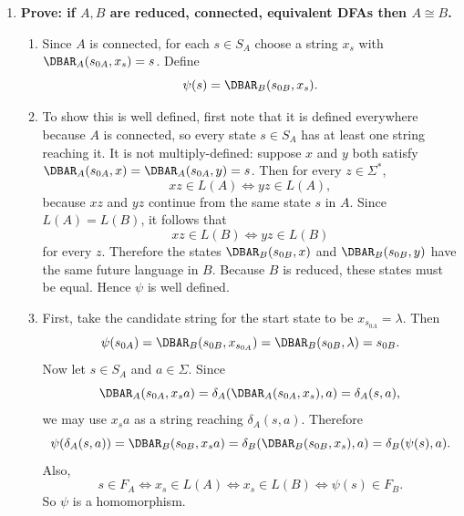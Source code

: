 \begin{enumerate}[{3.}1.]
\begin{enumerate}
\item $D/_{E_D}$ has the seven states
\[
[S_0]=[S_3],\ [S_1]=[S_4],\ [S_2]=[S_5],\ [S_6],\ [S_7],\ [S_8],\ [S_9].
\]
Its initial state is $[S_0]=[S_3]$, its final states are $[S_1]=[S_4]$ and
$[S_7]$, and its transition table is
\[
\begin{array}{c|cc}
 & a & b\\\hline
{}[S_0]=[S_3] & [S_1]=[S_4] & [S_0]=[S_3]\\
{}[S_1]=[S_4] & [S_2]=[S_5] & [S_1]=[S_4]\\
{}[S_2]=[S_5] & [S_2]=[S_5] & [S_1]=[S_4]\\
{}[S_6] & [S_6] & [S_7]\\
{}[S_7] & [S_7] & [S_7]\\
{}[S_8] & [S_0]=[S_3] & [S_9]\\
{}[S_9] & [S_2]=[S_5] & [S_2]=[S_5]
\end{array}
\]
The connected part of this quotient is isomorphic to the three-state machine
$A_{R_{L(D)}}$ above.
\end{enumerate}

\item \textbf{Prove: if $A,B$ are reduced, connected, equivalent DFAs then $A\cong B$.}

\begin{enumerate}
\item Since $A$ is connected, for each $s\in S_A$ choose a string $x_s$ with
$\DBAR_A(s_{0A},x_s)=s$. Define
\[
\psi(s)=\DBAR_B(s_{0B},x_s).
\]

\item To show this is well defined, first note that it is defined everywhere because $A$ is connected, so every state $s\in S_A$ has at least one string reaching it. It is not multiply-defined: suppose $x$ and $y$ both satisfy
$\DBAR_A(s_{0A},x)=\DBAR_A(s_{0A},y)=s$. Then for every $z\in\Sigma^*$,
\[
xz\in L(A)\Leftrightarrow yz\in L(A),
\]
because $xz$ and $yz$ continue from the same state $s$ in $A$. Since
$L(A)=L(B)$, it follows that
\[
xz\in L(B)\Leftrightarrow yz\in L(B)
\]
for every $z$. Therefore the states $\DBAR_B(s_{0B},x)$ and
$\DBAR_B(s_{0B},y)$ have the same future language in $B$. Because $B$ is
reduced, these states must be equal. Hence $\psi$ is well defined.

\item First, take the candidate string for the start state to be
$x_{s_{0A}}=\lambda$. Then
\[
\psi(s_{0A})=\DBAR_B(s_{0B},x_{s_{0A}})
=\DBAR_B(s_{0B},\lambda)=s_{0B}.
\]
Now let $s\in S_A$ and $a\in\Sigma$. Since
\[
\DBAR_A(s_{0A},x_sa)=\delta_A(\DBAR_A(s_{0A},x_s),a)=\delta_A(s,a),
\]
we may use $x_sa$ as a string reaching $\delta_A(s,a)$. Therefore
\[
\psi(\delta_A(s,a))=\DBAR_B(s_{0B},x_sa)=\delta_B(\DBAR_B(s_{0B},x_s),a)
=\delta_B(\psi(s),a).
\]
Also,
\[
s\in F_A \Leftrightarrow x_s\in L(A) \Leftrightarrow x_s\in L(B)
\Leftrightarrow \psi(s)\in F_B.
\]
So $\psi$ is a homomorphism.


\end{enumerate}
\end{enumerate}
